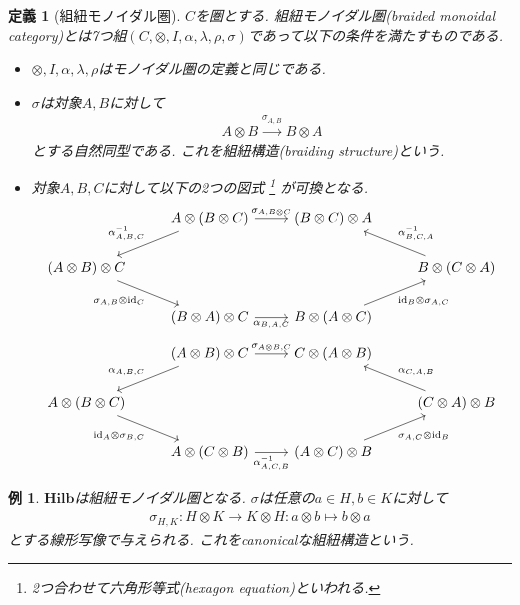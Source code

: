 \documentclass[a4paper,12pt]{ltjsarticle}
\theoremstyle{break}
\newtheorem{defn}[thm]{定義}
\newtheorem{eg}[thm]{例}
\newcommand{\hilb}{\mathbf{Hilb}}
\newcommand{\xr}[1]{\xrightarrow{#1}}
\newcommand{\id}{\mathrm{id}}
\newcommand{\al}{\alpha}
\newcommand{\la}{\lambda}
\newcommand{\si}{\sigma}
\newcommand{\mt}{\mapsto}
\newcommand{\ot}{\otimes}
\numberwithin{equation}{section}
\begin{document}
\begin{defn}[組紐モノイダル圏]
  $C$を圏とする. 組紐モノイダル圏(braided monoidal category)とは7つ組$(C,\ot,I,\al,\la,\rho,\si)$であって以下の条件を満たすものである. 
  \begin{itemize}
    \item $\ot,I,\al,\la,\rho$はモノイダル圏の定義と同じである. 
    \item $\si$は対象$A,B$に対して
    \begin{align*}
      A \ot B \xr{\si_{A,B}} B \ot A
    \end{align*}
    とする自然同型である. これを組紐構造(braiding structure)という.  
    \item 対象$A,B,C$に対して以下の2つの図式
    \footnote{
      2つ合わせて六角形等式(hexagon equation)といわれる. 
    }
    が可換となる.
    \[\begin{tikzcd}
      & {A \ot (B \ot C)} & {(B \ot C)\ot A} \\
      {(A \ot B) \ot C} &&& {B \ot (C \ot A)} \\
      & {(B \ot A) \ot C} & {B \ot (A \ot C)}
      \arrow["{\al_{A,B,C}^{-1}}"', from=1-2, to=2-1]
      \arrow["{\si_{A,B \ot C}}", from=1-2, to=1-3]
      \arrow["{\al_{B,C,A}^{-1}}"', from=2-4, to=1-3]
      \arrow["{\id_{B} \ot \si_{A,C}}"', from=3-3, to=2-4]
      \arrow["{\si_{A,B} \ot \id_C}"', from=2-1, to=3-2]
      \arrow["{\al_{B,A,C}}"', from=3-2, to=3-3]
    \end{tikzcd}\]
    \[\begin{tikzcd}
      & {(A \ot B) \ot C} & {C \ot (A \ot B)} \\
      {A \ot (B \ot C)} &&& {(C \ot A) \ot B} \\
      & {A \ot (C \ot B)} & {(A \ot C) \ot B}
      \arrow["{\al_{A,B,C}}"', from=1-2, to=2-1]
      \arrow["{\si_{A \ot B, C}}", from=1-2, to=1-3]
      \arrow["{\al_{C,A,B}}"', from=2-4, to=1-3]
      \arrow["{\si_{A,C} \ot \id_B}"', from=3-3, to=2-4]
      \arrow["{\id_A \ot \si_{B,C}}"', from=2-1, to=3-2]
      \arrow["{\al_{A,C,B}^{-1}}"', from=3-2, to=3-3]
    \end{tikzcd}\]
  \end{itemize}
\end{defn}   

\begin{eg}
  $\hilb$は組紐モノイダル圏となる. 
  $\si$は任意の$a \in H, b \in K$に対して
  \begin{align*}
    \si_{H,K}: H \ot K \to K \ot H: a \ot b \mt b \ot a
  \end{align*}
  とする線形写像で与えられる.  
  これをcanonicalな組紐構造という. 
\end{eg}
\end{document}
